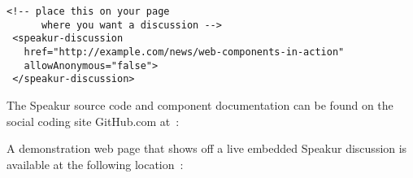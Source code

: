 \begin{lstlisting}[language=HTML5,caption={Speakur custom HTML element.},label=l:example1]
 <!-- place this on your page
      where you want a discussion -->
 <speakur-discussion
   href="http://example.com/news/web-components-in-action"
   allowAnonymous="false">
 </speakur-discussion>
\end{lstlisting}

The Speakur source code and component documentation can be found on the social coding site GitHub.com at~\cite{landers2015-b}:


A demonstration web page that shows off a live embedded Speakur discussion is available at the following location~\cite{landers2015-c}:

